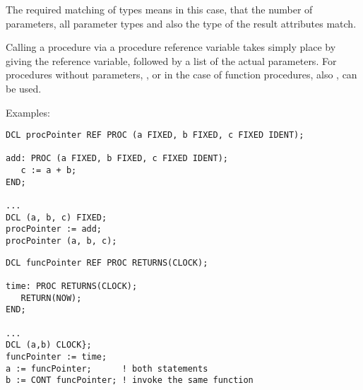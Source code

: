 \begin{grammarframe}

\end{grammarframe}


The required matching of types means in this case, that the number of
parameters, all parameter types and also the type of the result
attributes match.

Calling a procedure via a procedure reference variable takes simply
place by giving the reference variable, followed by a list of the actual
parameters. For procedures without parameters, , or in the case of
function procedures, also , can be used.

Examples:
\begin{lstlisting}
DCL procPointer REF PROC (a FIXED, b FIXED, c FIXED IDENT);

add: PROC (a FIXED, b FIXED, c FIXED IDENT);
   c := a + b;
END;

...
DCL (a, b, c) FIXED;
procPointer := add;
procPointer (a, b, c);
\end{lstlisting}

\begin{lstlisting}
DCL funcPointer REF PROC RETURNS(CLOCK);

time: PROC RETURNS(CLOCK);
   RETURN(NOW);
END;

...
DCL (a,b) CLOCK};
funcPointer := time;
a := funcPointer;      ! both statements
b := CONT funcPointer; ! invoke the same function
\end{lstlisting}

